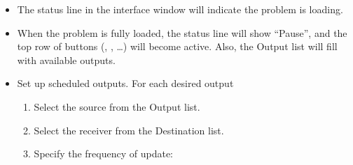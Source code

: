 \begin{list}{}{\setlength{\labelwidth}{0pt}
               \setlength{\leftmargin}{0pt}
               \setlength{\rightmargin}{\leftmargin}
               \setlength{\itemsep}{0pt}}
\begin{description}
\begin{itemize}
        dialog box will appear.  On this window:
        \begin{itemize}
          \item Double click in the  subwindow to change
                directories. Numerous sample problems can be found in
                the directory .
          \item To load a problem, double click on a  file
                (e.g., stdprob1.mif) from the list above the 
                subwindow.
        \end{itemize}
        The native input format for the 3D solver is the
        format, which must be composed by hand using a plain text
        editor.  (See the  documentation for additional
        details.)  However, \MIF~1.1 (i.e., 2D problem) files are
        readable by , or may be converted to the \MIF~2.1
        format using the command line tool
        .
        also supports an extension to the \MIF~1.1
        format, namely \MIF~1.2, which provides limited 3D
        functionality.  \MIF~1.2 files may also be read directly by
        .  Either way, to run in  a problem
        created by , the problem must first be saved to
        disk via the  menu option in
        .
      \item The status line in the  interface window will
        indicate the problem is loading. 
      \item When the problem is fully loaded, the status line will
        show ``Pause'', and the top row of buttons (,
        , \ldots) will become active.  Also, the
        Output list will fill with available outputs.
      \item Set up scheduled outputs.  For each desired output
      \begin{enumerate}
         \item Select the source from the Output list.
         \item Select the receiver from the Destination list.
         \item Specify the frequency of update:

\end{enumerate}
\end{itemize}
\end{description}
\end{list}
